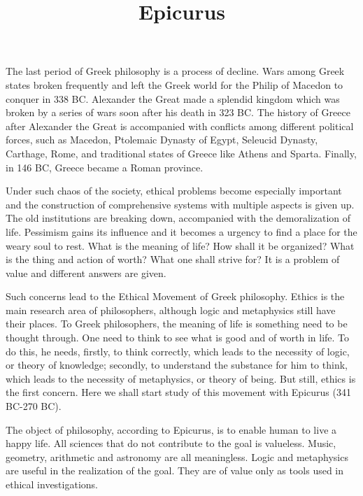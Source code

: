 \documentclass[11pt]{article}
\title{Epicurus}
\date{}
\begin{document}
  \maketitle

  \linenumbers
  
The last period of Greek philosophy is a process of decline. 
Wars among Greek states broken frequently and left the Greek world for the Philip of Macedon to conquer in 338 BC. 
Alexander the Great made a splendid kingdom which was broken by a series of wars soon after his death in 323 BC. 
The history of Greece after Alexander the Great is accompanied with conflicts among different political forces, such as Macedon, Ptolemaic Dynasty of Egypt, Seleucid Dynasty, Carthage, Rome, and traditional states of Greece like Athens and Sparta. 
Finally, in 146 BC, Greece became a Roman province.

\newline

Under such chaos of the society, ethical problems become especially important and the construction of comprehensive systems with multiple aspects is given up. 
The old institutions are breaking down, accompanied with the demoralization of life. 
Pessimism gains its influence and it becomes a urgency to find a place for the weary soul to rest. 
What is the meaning of life? 
How shall it be organized? 
What is the thing and action of worth? 
What one shall strive for? 
It is a problem of value and different answers are given.

\newline

Such concerns lead to the Ethical Movement of Greek philosophy. 
Ethics is the main research area of philosophers, although logic and metaphysics still have their places. 
To Greek philosophers, the meaning of life is something need to be thought through. 
One need to think to see what is good and of worth in life. 
To do this, he needs, firstly, to think correctly, which leads to the necessity of logic, or theory of knowledge; 
secondly, to understand the substance for him to think, which leads to the necessity of metaphysics, or theory of being. 
But still, ethics is the first concern. 
Here we shall start study of this movement with Epicurus (341 BC-270 BC).

\newline

The object of philosophy, according to Epicurus, is to enable human to live a happy life. 
All sciences that do not contribute to the goal is valueless. 
Music, geometry, arithmetic and astronomy are all meaningless. 
Logic and metaphysics are useful in the realization of the goal. 
They are of value only as tools used in ethical investigations.
\end{document}
